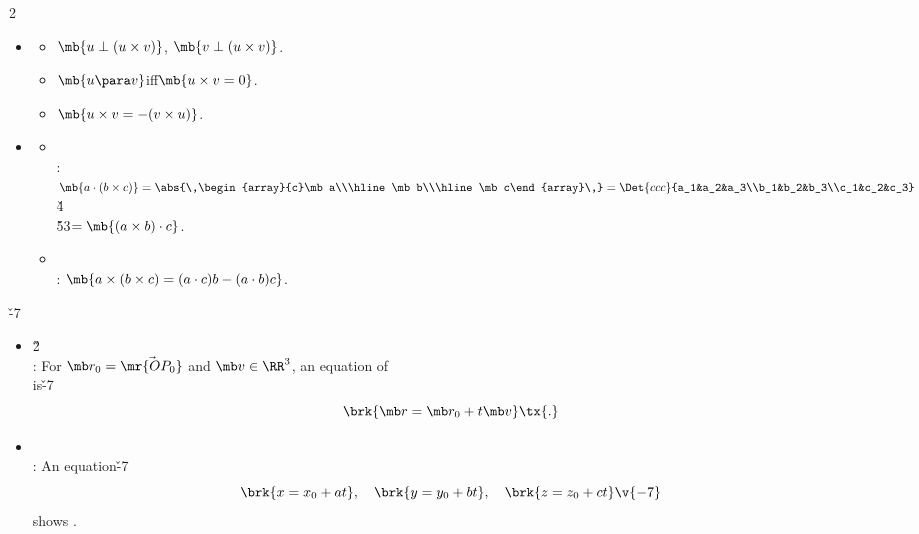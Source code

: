 \documentclass[dvipdfmx,a4paper,titlepage,9pt]{jsarticle}
\begin{document}
\begin{multicols*}{2}
\begin{itemize}[label={-}]
\item{}
\begin{itemize}[label=\Cdot]
\setlength{\leftskip}{-5pt}
\item $\mb{u\perp(u\times v)}$, $\mb{v\perp(u\times v)}$.
\item $\mb{u\para v}$\quad iff\quad $\mb{u\times v=0}$.
\item $\mb{u\times v=-(v\times u)}$.\\
\end{itemize}

\item{}
\begin{itemize}[label=\Cdot]
\setlength{\leftskip}{-5pt}
\item {} \\
      : $\mb{a\cdot(b\times c)}=\abs{\,\begin{array}{c}\mb a\\\hline\mb b\\\hline\mb c\end{array}\,}=\Det{ccc}{a_1&a_2&a_3\\b_1&b_2&b_3\\c_1&c_2&c_3}$\v4\\
      \h{53}$=\mb{(a\times b)\cdot c}$.\\
\item {} \\
     : $\mb{a\times (b\times c)=(a\cdot c)b-(a\cdot b)c}$.
\end{itemize}
\end{itemize}

\newpage

\v{-7}
\begin{itemize}[label={-}]
\item{}\v2\\
: For $\mb r_0=\Vec{\mr{OP_0}}$ and $\mb v\in\RR^3$, an equation of \\
\;\; is\v{-7}
$$\brk{\mb r=\mb r_0+t\mb v}\tx{.}$$

\item{}\\
: An equation\v{-7}
$$\brk{x=x_0+at},\quad \brk{y=y_0+bt},\quad \brk{z=z_0+ct}\v{-7}$$
\;\;shows . \\


\end{itemize}
\end{multicols*}
\end{document}
